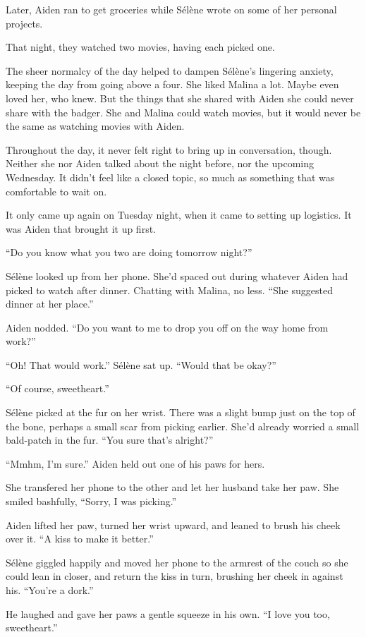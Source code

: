 Later, Aiden ran to get groceries while Sélène wrote on some of her personal projects.

That night, they watched two movies, having each picked one.

The sheer normalcy of the day helped to dampen Sélène's lingering anxiety, keeping the day from going above a four. She liked Malina a lot. Maybe even loved her, who knew. But the things that she shared with Aiden she could never share with the badger. She and Malina could watch movies, but it would never be the same as watching movies with Aiden.

Throughout the day, it never felt right to bring up in conversation, though. Neither she nor Aiden talked about the night before, nor the upcoming Wednesday. It didn't feel like a closed topic, so much as something that was comfortable to wait on.

It only came up again on Tuesday night, when it came to setting up logistics. It was Aiden that brought it up first.

``Do you know what you two are doing tomorrow night?''

Sélène looked up from her phone. She'd spaced out during whatever Aiden had picked to watch after dinner. Chatting with Malina, no less. ``She suggested dinner at her place.''

Aiden nodded. ``Do you want to me to drop you off on the way home from work?''

``Oh! That would work.'' Sélène sat up. ``Would that be okay?''

``Of course, sweetheart.''

Sélène picked at the fur on her wrist. There was a slight bump just on the top of the bone, perhaps a small scar from picking earlier. She'd already worried a small bald-patch in the fur. ``You sure that's alright?''

``Mmhm, I'm sure.'' Aiden held out one of his paws for hers.

She transfered her phone to the other and let her husband take her paw. She smiled bashfully, ``Sorry, I was picking.''

Aiden lifted her paw, turned her wrist upward, and leaned to brush his cheek over it. ``A kiss to make it better.''

Sélène giggled happily and moved her phone to the armrest of the couch so she could lean in closer, and return the kiss in turn, brushing her cheek in against his. ``You're a dork.''

He laughed and gave her paws a gentle squeeze in his own. ``I love you too, sweetheart.''

